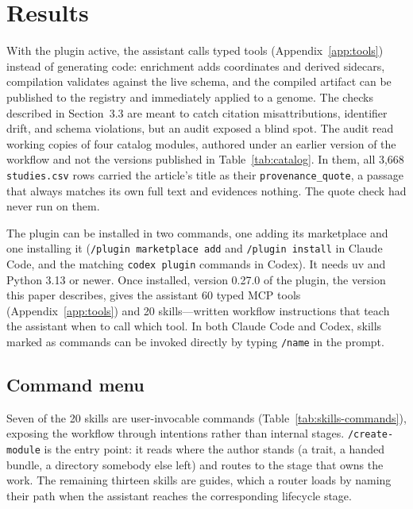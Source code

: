 \documentclass[11pt,a4paper]{article}
\begin{document}
\section{Results}

\label{sec:checks}

With the plugin active, the assistant calls typed tools
(Appendix~\ref{app:tools}) instead of generating code: enrichment adds
coordinates and derived sidecars, compilation validates against the live
schema, and the compiled artifact can be published to the registry and
immediately applied to a genome. The checks described in
Section~3.3 are meant to catch citation misattributions, identifier drift, and
schema violations, but an audit exposed a blind spot. The audit read working copies of four
catalog modules, authored under an earlier version of the workflow and not the
versions published in Table~\ref{tab:catalog}. In them, all 3,668
\texttt{studies.csv} rows carried the article's title as their
\texttt{provenance\_quote}, a passage that always matches its own full text and
evidences nothing. The quote check had never run on them.

The plugin can be installed in two commands, one adding its marketplace and one
installing it (\texttt{/plugin marketplace add} and \texttt{/plugin install} in
Claude Code, and the matching \texttt{codex plugin} commands in Codex). It
needs uv and Python 3.13 or newer. Once installed, version 0.27.0 of the plugin, the version this paper
describes, gives the assistant 60 typed
MCP tools (Appendix~\ref{app:tools}) and 20 skills---written workflow
instructions that teach the assistant when to call which tool. In both
Claude Code and Codex, skills marked as commands can be invoked directly
by typing \texttt{/name} in the prompt.

\subsection{Command menu}

Seven of the 20 skills are user-invocable commands (Table~\ref{tab:skills-commands}),
exposing the workflow through intentions rather than internal stages.
\texttt{/create-module} is the entry point: it reads where the author
stands (a trait, a handed bundle, a directory somebody else
left) and routes to the stage that owns the work. The remaining thirteen
skills are guides, which a router loads by naming their path when
the assistant reaches the corresponding lifecycle stage. 
\end{document}
